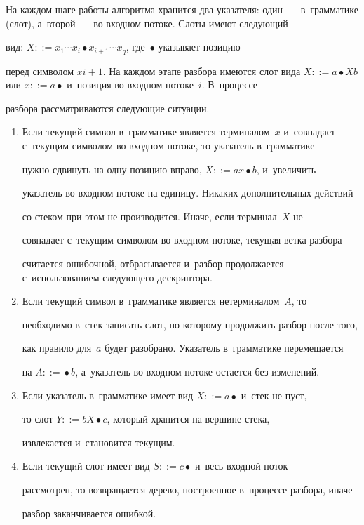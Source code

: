 На каждом шаге работы алгоритма хранится два указателя: один~--- в~грамматике (слот), а~второй~--- во входном потоке. Слоты имеют следующий


вид: $X {::=} x_1 \cdots x_i \bullet  x_{i+1} \cdots  x_q$, где~$\bullet$ указывает позицию


перед символом $xi+1$. На каждом этапе разбора имеются слот вида $X {::=}


a\bullet Xb$ или $x {::=} a\bullet$ и~позиция во входном потоке~$i$. В~процессе


разбора рассматриваются следующие ситуации.


\begin{enumerate}[1.]


\item Если текущий символ в~грамматике является терминалом~$x$ и~совпадает с~текущим символом во входном потоке, то указатель в~грамматике


нужно сдвинуть на одну позицию вправо, $X {::=} ax\bullet b$, и~увеличить


указатель во входном потоке на единицу. Никаких дополнительных действий


со стеком при этом не производится. Иначе, если терминал~$X$ не


совпадает с~текущим символом во входном потоке, текущая ветка разбора


считается ошибочной, отбрасывается и~разбор продолжается с~использованием следующего дескриптора.


\item Если текущий символ в~грамматике является нетерминалом~$A$, то


необходимо в~стек записать слот, по которому продолжить разбор после того,


как правило для~$a$ будет разобрано. Указатель в~грамматике перемещается


на $A {::=} \bullet b$, а~указатель во входном потоке остается без изменений.


\item Если указатель в~грамматике имеет вид $X {::=} a\bullet$ и~стек не пуст,


то слот $Y {::=} bX \bullet c$, который хранится на вершине стека,


извлекается и~становится текущим.


\item Если текущий слот имеет вид $S {::=} c\bullet$ и~весь входной поток


рассмотрен, то возвращается дерево, построенное в~процессе разбора, иначе


разбор заканчивается ошибкой.


\end{enumerate}





